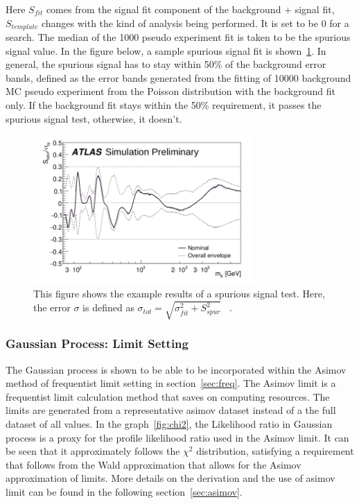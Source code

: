     Here $S_{fit}$ comes from the signal fit component of the background + signal fit, $S_{template}$ changes with the kind of analysis being performed. It is set to be 0 for a search. 
    The median of the 1000 pseudo experiment fit is taken to be the spurious signal value. 
    In the figure below, a sample spurious signal fit is shown~\ref{spurioussignal}.
    In general, the spurious signal has to stay within 50\% of the background error bands, defined as the error bands generated from the fitting of 10000 background MC pseudo experiment from the Poisson distribution with the background fit only.
    If the background fit stays within the 50\% requirement, it passes the spurious signal test, otherwise, it doesn't. 

\begin{figure}[!htb]
    \begin{center}
        \includegraphics[width=0.75\textwidth]{figures/chapter_analysismethod/Spurious}
        \caption{
            This figure shows the example results of a spurious signal test. Here, the error $\sigma$ is defined as $\sigma_{tot} = \sqrt{\sigma^{2}_{fit}+ S_{spur}^{2}}$ ~\cite{ATL-PHYS-PUB-2020-028}.
        }
        \label{spurioussignal}
    \end{center}
\end{figure}
\FloatBarrier

    \subsubsection{Gaussian Process: Limit Setting}

    The Gaussian process is shown to be able to be incorporated within the Asimov method of frequentist limit setting in section~\ref{sec:freq}. The Asimov limit is a frequentist limit calculation method that saves on computing resources. The limits are generated from a representative asimov dataset instead of a the full dataset of all values.
    In the graph~\ref{fig:chi2}, the Likelihood ratio in Gaussian process is a proxy for the profile likelihood ratio used in the Asimov limit. It can be seen that it approximately follows the $\chi^{2}$ distribution, satisfying a requirement that follows from the Wald approximation that allows for the Asimov approximation of limits.
    More details on the derivation and the use of asimov limit can be found in the following section~\ref{sec:asimov}.

